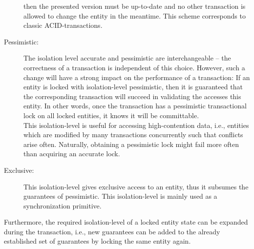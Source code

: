 \documentclass[a4paper, 10pt]{book}
\begin{document}
\begin{description}
                                    then the presented version must be up-to-date and no other
                                    transaction is allowed to change the entity in the meantime.
                                    This scheme corresponds to classic ACID-transactions.
                                \item[Pessimistic:] The isolation level accurate and pessimistic are
                                    interchangeable -- the correctness of a transaction is independent
                                    of this choice. However, such a change will have a strong impact on
                                    the performance of a transaction:
                                    If an entity is locked with isolation-level pessimistic, then it is
                                    guaranteed that the corresponding transaction will succeed in
                                    validating the accesses this entity. In other words, once the
                                    transaction has a pessimistic transactional lock on all locked
                                    entities, it knows it will be committable.\\
                                    This isolation-level is useful for accessing high-contention data,
                                    i.e., entities which are modified by many transactions concurrently
                                    such that conflicts arise often. Naturally, obtaining a pessimistic
                                    lock might fail more often than acquiring an accurate lock.
                                    \item[Exclusive:] This isolation-level gives exclusive access to an
                                        entity, thus it subsumes the guarantees of pessimistic. This
                                        isolation-level is mainly used as a synchronization primitive. 
                                \end{description}

                                Furthermore, the required isolation-level of a locked entity state
                                can be expanded during the transaction, i.e., new guarantees can be
                                added to the already established set of guarantees by locking the same
                                entity again. 
\end{document}
